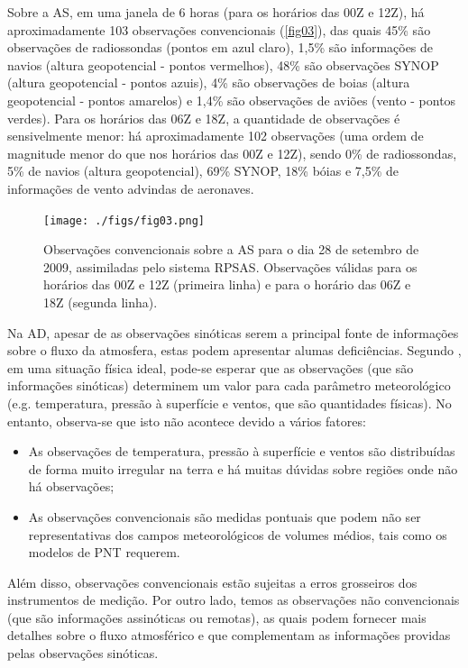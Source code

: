 Sobre a AS, em uma janela de 6 horas (para os horários das 00Z e 12Z), há \-a\-pro\-xi\-ma\-da\-men\-te 103 observações convencionais (\autoref{fig03}), das quais 45\% são observações de radiossondas (pontos em azul claro), 1,5\% são informações de navios (altura geopotencial - pontos vermelhos), 48\% são observações SYNOP (altura geopotencial - pontos azuis), 4\% são observações de boias (altura geopotencial - pontos amarelos) e 1,4\% são observações de aviões (vento - pontos verdes). Para os horários das 06Z e 18Z, a quantidade de observações é sensivelmente menor: há aproximadamente 102 observações (uma ordem de magnitude menor do que nos horários das 00Z e 12Z), sendo 0\% de radiossondas, 5\% de navios (altura geopotencial), 69\% SYNOP, 18\% bóias e 7,5\% de informações de vento advindas de aeronaves.

\begin{figure}
\centering
\texttt{[image: ./figs/fig03.png]}
\caption{Observações convencionais sobre a AS para o dia 28 de setembro de 2009, assimiladas pelo sistema RPSAS. Observações válidas para os horários das 00Z e 12Z (primeira linha) e para o horário das 06Z e 18Z (segunda linha).}
\label{fig03}
\end{figure}

Na AD, apesar de as observações sinóticas serem a principal fonte de informações sobre o fluxo da atmosfera, estas podem apresentar alumas deficiências. Segundo \cite{morel1980}, em uma situação física ideal, pode-se esperar que as observações (que são informações sinóticas) determinem um valor para cada parâmetro meteorológico (e.g. temperatura, pressão à superfície e ventos, que são quantidades físicas). No entanto, observa-se que isto não acontece devido a vários fatores:

\begin{itemize}
\item As observações de temperatura, pressão à superfície e ventos são distribuídas de forma muito irregular na terra e há muitas dúvidas sobre regiões onde não há observações;
\item As observações convencionais são medidas pontuais que podem não ser representativas dos campos meteorológicos de volumes médios, tais como os modelos de PNT requerem.
\end{itemize}

Além disso, observações convencionais estão sujeitas a erros grosseiros dos instrumentos de medição. Por outro lado, temos as observações não convencionais (que são informações assinóticas ou remotas), as quais podem fornecer mais detalhes sobre o fluxo atmosférico e que complementam as informações providas pelas observações sinóticas. 

